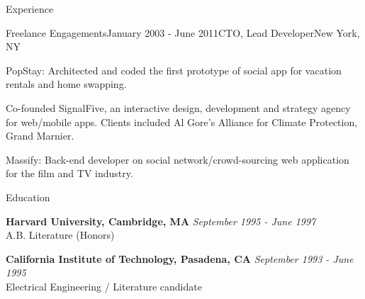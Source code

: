 \documentclass{resume} %
\begin{document}
\begin{rSection}{Experience}

\begin{rSubsection}{Freelance Engagements}{January 2003 - June 2011}{CTO, Lead Developer}{New York, NY}
\item PopStay: Architected and coded the first prototype of social app for vacation rentals and home swapping.
\item Co-founded SignalFive, an interactive design, development and strategy agency for web/mobile apps. Clients included Al Gore's Alliance for Climate Protection, Grand Marnier. 
\item Massify: Back-end developer on social network/crowd-sourcing web application for the film and TV industry.
\end{rSubsection}

\end{rSection}



\begin{rSection}{Education}

{\bf Harvard University, Cambridge, MA} \hfill {\em September 1995 - June 1997} \\ 
A.B. Literature (Honors)

{\bf California Institute of Technology, Pasadena, CA} \hfill {\em September 1993 - June 1995} \\ 
Electrical Engineering / Literature candidate\\

\end{rSection}





\end{document}
